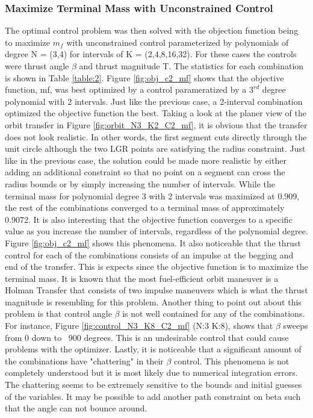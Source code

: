 \documentclass[]{article}
\begin{document}
	\subsubsection{Maximize Terminal Mass with Unconstrained Control}
	 The optimal control problem was then solved with the objection function being to maximize \(m_f\) with unconstrained control parameterized by polynomials of degree N = (3,4) for intervals of K = (2,4,8,16,32). For these cases the controls were thrust angle \(\beta\) and thrust magnitude T. The statistics for each combination is shown in Table \ref{table:2}. Figure \ref{fig:obj_c2_mf} shows that the objective function, mf, was best optimized by a control parameratized by a \(3^{rd}\) degree polynomial with 2 intervals. Just like the previous case, a 2-interval combination optimized the objective function the best. Taking a look at the planer view of the orbit transfer in Figure \ref{fig:orbit_N3_K2_C2_mf}, it is obvious that the transfer does not look realistic. In other words, the first segment cuts directly through the unit circle although the two LGR points are satisfying the radius constraint. Just like in the previous case, the solution could be made more realistic by either adding an additional constraint so that no point on a segment can cross the radius bounds or by simply increasing the number of intervals. While the terminal mass for polynomial degree 3 with 2 intervals was maximized at 0.909, the rest of the combinations converged to a terminal mass of approximately 0.9072. It is also interesting that the objective function converges to a specific value as you increase the number of intervals, regardless of the polynomial degree. Figure \ref{fig:obj_c2_mf} shows this phenomena. It also noticeable that the thrust control for each of the combinations consists of an impulse at the begging and end of the transfer. This is expects since the objective function is to maximize the terminal mass. It is known that the most fuel-efficient orbit maneuver is a Holman Transfer that consists of two impulse maneuvers which is what the thrust magnitude is resembling for this problem. Another thing to point out about this problem is that control angle \(\beta\) is not well contained for any of the combinations. For instance, Figure \ref{fig:control_N3_K8_C2_mf} (N:3 K:8), shows that \(\beta\) sweeps from 0 down to ~900 degrees. This is an undesirable control that could cause problems with the optimizer. Lastly, it is noticeable that a significant amount of the combinations have "chattering" in their \(\beta\) control. This phenomena is not completely understood but it is most likely due to numerical integration errors. The chattering seems to be extremely sensitive to the bounds and initial guesses of the variables. It may be possible to add another path constraint on beta such that the angle can not bounce around.
\end{document}
